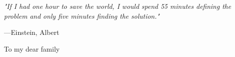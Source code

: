 \documentclass[12pt,a4paper]{Thesis} %
\begin{document}

\pagestyle{empty} %
\emph{"If I had one hour to save the world, I would spend 55 minutes defining the problem and only five minutes finding the solution."}

\begin{flushright}
---Einstein, Albert
\end{flushright}
\null\vfill %

\begin{center}
\large{To my dear family}
\end{center}
\vfill\vfill\null %
\cleardoublepage %

\pagestyle{fancy} %
\fancyhead{}   %
\fancyhead[LO]{\sl{\leftmark}}
\fancyhead[RE]{\sl{\rightmark}}
\fancyhead[LE,RO]{\thepage}



\pagestyle{fancy} %

\tableofcontents %

\listoffigures %

\listoftables %



%
%
\end{document}
